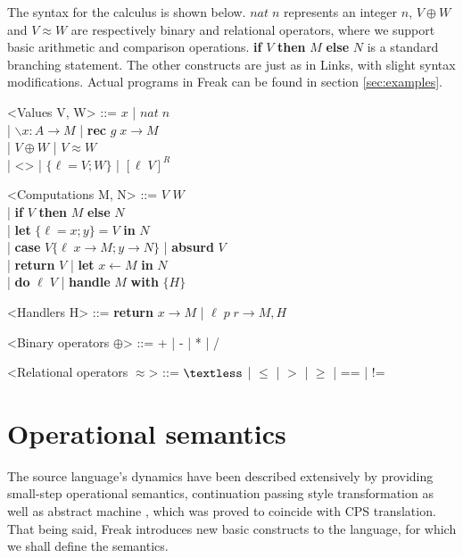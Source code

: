\documentclass{article}
\theoremstyle{definition}
\theoremstyle{lemma}
\theoremstyle{observation}
\theoremstyle{theorem}
\begin{document}
    The syntax for the calculus is shown below. $nat \; n$ represents an integer $n$,
    $V \oplus W$ and $V \approx W$ are respectively binary and relational
    operators, where we support basic arithmetic and comparison operations.
    \textbf{if} $V$ \textbf{then} $M$ \textbf{else} $N$ is a standard branching statement.
    The other constructs are just as in Links, with slight syntax modifications.
    Actual programs in Freak can be found in section \ref{sec:examples}.

    \begin{grammar}

        <Values V, W> ::= $ x $ | $nat \; n$ \\
            | $ \backslash x : A \rightarrow M $ | \textbf{rec} $ g \; x \rightarrow M $\\
            | $V \oplus W$ | $V \approx W$ \\
            | <> | $ \{ \ell = V; W\} $  | $[ \ell \; V]^{R}$

        <Computations M, N> ::= $ V $ $ W $ \\
            | \textbf{if} $V$ \textbf{then} $M$ \textbf{else} $N$ \\
            | \textbf{let} $\{\ell  = x; y\} = V$ \textbf{in} $ N $ \\
            | \textbf{case} $V \{ \ell \; x \rightarrow M; y \rightarrow N\}$ | \textbf{absurd} $ V $ \\
            | \textbf{return} $V$ | \textbf{let} $ x \leftarrow M $ \textbf{in} $ N $ \\
            | \textbf{do} $\ell \; V$ | \textbf{handle} $M$ \textbf{with} $ \{ H \} $

        <Handlers H> ::= \textbf{return} $ x \rightarrow M $ | $ \ell \; p \; r \rightarrow M, H $

        <Binary operators $\oplus$> ::= + | - | * | /

        <Relational operators $\approx$> ::= $ \textless $ | $\leqslant$ | $>$ | $\geqslant$ | == | !=

    \end{grammar}

\section{Operational semantics}

    The source language's dynamics have been described
    extensively by providing small-step operational semantics,
    continuation passing style transformation \cite{handlers-cps} as well
    as abstract machine \cite{liberating-effects}, which was proved to coincide
    with CPS translation. That being said, Freak introduces new basic
    constructs to the language, for which we shall define the semantics.
\end{document}
